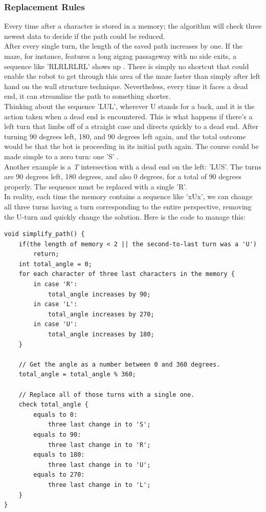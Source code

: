 \documentclass{article}
\begin{document}
\subsubsection{Replacement Rules}
Every time after a character is stored in a memory; the algorithm will check three newest data to decide if the path could be reduced.\\
After every single turn, the length of the saved path increases by one. If the maze, for instance, features a long zigzag passageway with no side exits, a sequence like 'RLRLRLRL' shows up \cite{ref3}. There is simply no shortcut that could enable the robot to get through this area of the maze faster than simply after left hand on the wall structure technique. Nevertheless, every time it faces a dead end, it can streamline the path to something shorter.\\
Thinking about the sequence 'LUL', wherever U stands for a back, and it is the action taken when a dead end is encountered. This is what happens if there's a left turn that limbs off of a straight case and directs quickly to a dead end. After turning 90 degrees left, 180, and 90 degrees left again, and the total outcome would be that the bot is proceeding in its initial path again. The course could be made simple to a zero turn: one 'S' \cite{ref3}.\\
Another example is a \textit{T} intersection with a dead end on the left: 'LUS'. The turns are 90 degrees left, 180 degrees, and also 0 degrees, for a total of 90 degrees properly. The sequence must be replaced with a single 'R'.\\

In reality, each time the memory contains a sequence like 'xUx', we can change all three turns having a turn corresponding to the entire perspective, removing the U-turn and quickly change the solution. Here is the code to manage this:

\begin{lstlisting}[style=CStyle]
void simplify_path() {
	if(the length of memory < 2 || the second-to-last turn was a 'U')
		return;	
	int total_angle = 0;
	for each character of three last characters in the memory {
		in case 'R':
			total_angle increases by 90;
		in case 'L':
			total_angle increases by 270;
		in case 'U':
			total_angle increases by 180;
	}
	
	// Get the angle as a number between 0 and 360 degrees.
	total_angle = total_angle % 360;

	// Replace all of those turns with a single one.
	check total_angle {
		equals to 0:
			three last change in to 'S';
		equals to 90:
			three last change in to 'R';
		equals to 180:
			three last change in to 'U';
		equals to 270:
			three last change in to 'L';
	}
}
\end{lstlisting}
\end{document}
